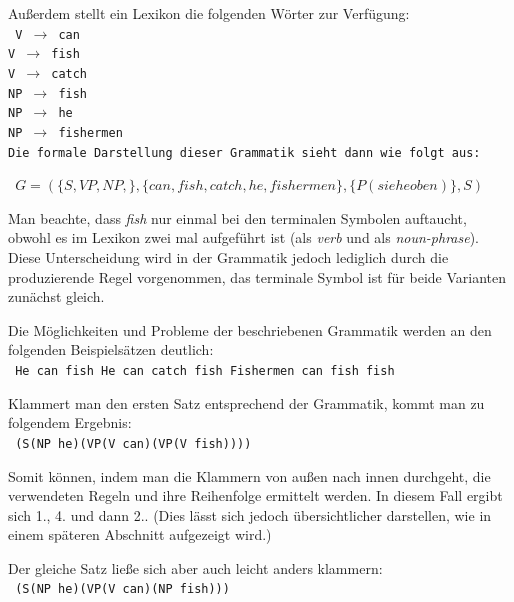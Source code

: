 \documentclass[12pt]{report}
\begin{document}
\rm

Außerdem stellt ein Lexikon die folgenden Wörter zur Verfügung:
\newline
\\
\tt
V $\rightarrow$ can\\
V $\rightarrow$ fish\\
V $\rightarrow$ catch\\
NP $\rightarrow$ fish\\
NP $\rightarrow$ he\\
NP $\rightarrow$ fishermen\\
\rm 
\newline
Die formale Darstellung dieser Grammatik sieht dann wie folgt aus:

\begin{center}
\tt
$G=(\lbrace S,VP,NP,\rbrace ,\lbrace can, fish, catch, he, fishermen\rbrace ,\lbrace P(siehe oben)\rbrace ,S)$
\rm
\end{center}

Man beachte, dass \textit{\glqq  fish\grqq{}} nur einmal bei den terminalen Symbolen auftaucht, obwohl es im Lexikon zwei mal aufgeführt ist (als \textit{verb} und als \textit{noun-phrase}). Diese Unterscheidung wird in der Grammatik jedoch lediglich durch die produzierende Regel vorgenommen, das terminale Symbol ist für beide Varianten zunächst gleich.

Die Möglichkeiten und Probleme der beschriebenen Grammatik werden an den folgenden Beispielsätzen deutlich:
\\

\tt
\glqq  He can fish\grqq{}
\glqq  He can catch fish\grqq{}
\glqq  Fishermen can fish fish\grqq{}
\rm

Klammert man den ersten Satz entsprechend der Grammatik, kommt man zu folgendem Ergebnis:\\

\tt 
(S(NP he)(VP(V can)(VP(V fish))))\\
\rm

Somit können, indem man die Klammern von außen nach innen durchgeht, die verwendeten Regeln und ihre Reihenfolge ermittelt werden. In diesem Fall ergibt sich 1., 4. und dann 2.. (Dies lässt sich jedoch übersichtlicher darstellen, wie in einem späteren Abschnitt aufgezeigt wird.)

Der gleiche Satz ließe sich aber auch leicht anders klammern:\\

\tt
(S(NP he)(VP(V can)(NP fish)))\\
\rm
\end{document}
